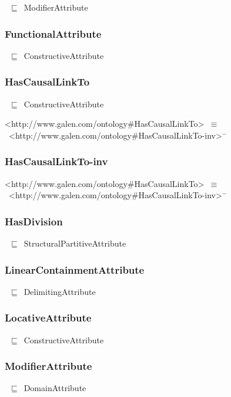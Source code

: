 \documentclass{article}
\begin{document}
~\ensuremath{\sqsubseteq}~ModifierAttribute

\subsubsection*{FunctionalAttribute}

~\ensuremath{\sqsubseteq}~ConstructiveAttribute

\subsubsection*{HasCausalLinkTo}

~\ensuremath{\sqsubseteq}~ConstructiveAttribute

<http://www.galen.com/ontology#HasCausalLinkTo>~\ensuremath{\equiv}~<http://www.galen.com/ontology#HasCausalLinkTo-inv>\ensuremath{^-}

\subsubsection*{HasCausalLinkTo-inv}

<http://www.galen.com/ontology#HasCausalLinkTo>~\ensuremath{\equiv}~<http://www.galen.com/ontology#HasCausalLinkTo-inv>\ensuremath{^-}

\subsubsection*{HasDivision}

~\ensuremath{\sqsubseteq}~StructuralPartitiveAttribute

\subsubsection*{LinearContainmentAttribute}

~\ensuremath{\sqsubseteq}~DelimitingAttribute

\subsubsection*{LocativeAttribute}

~\ensuremath{\sqsubseteq}~ConstructiveAttribute

\subsubsection*{ModifierAttribute}

~\ensuremath{\sqsubseteq}~DomainAttribute
\end{document}

